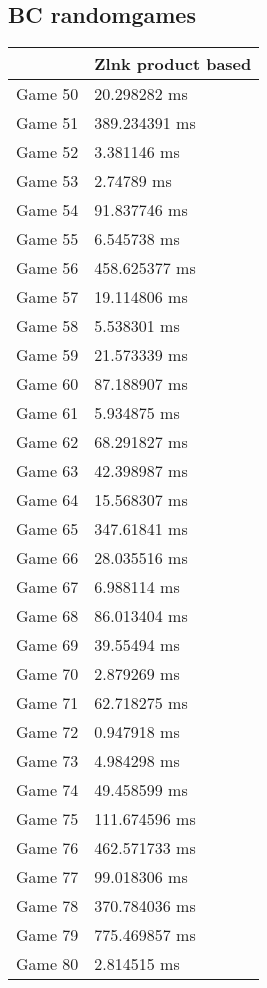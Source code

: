 \subsection{BC randomgames}
\begin{tabular}{|l|l|}
	\hline
	& Zlnk product based \\ \hline
	Game 50 & 20.298282 ms \\ \hline
	Game 51 & 389.234391 ms \\ \hline
	Game 52 & 3.381146 ms \\ \hline
	Game 53 & 2.74789 ms \\ \hline
	Game 54 & 91.837746 ms \\ \hline
	Game 55 & 6.545738 ms \\ \hline
	Game 56 & 458.625377 ms \\ \hline
	Game 57 & 19.114806 ms \\ \hline
	Game 58 & 5.538301 ms \\ \hline
	Game 59 & 21.573339 ms \\ \hline
	Game 60 & 87.188907 ms \\ \hline
	Game 61 & 5.934875 ms \\ \hline
	Game 62 & 68.291827 ms \\ \hline
	Game 63 & 42.398987 ms \\ \hline
	Game 64 & 15.568307 ms \\ \hline
	Game 65 & 347.61841 ms \\ \hline
	Game 66 & 28.035516 ms \\ \hline
	Game 67 & 6.988114 ms \\ \hline
	Game 68 & 86.013404 ms \\ \hline
	Game 69 & 39.55494 ms \\ \hline
	Game 70 & 2.879269 ms \\ \hline
	Game 71 & 62.718275 ms \\ \hline
	Game 72 & 0.947918 ms \\ \hline
	Game 73 & 4.984298 ms \\ \hline
	Game 74 & 49.458599 ms \\ \hline
	Game 75 & 111.674596 ms \\ \hline
	Game 76 & 462.571733 ms \\ \hline
	Game 77 & 99.018306 ms \\ \hline
	Game 78 & 370.784036 ms \\ \hline
	Game 79 & 775.469857 ms \\ \hline
	Game 80 & 2.814515 ms \\ \hline

\end{tabular}
